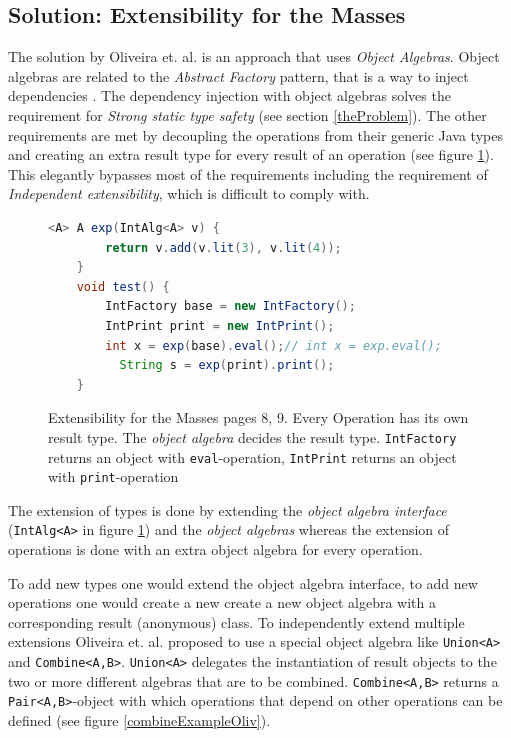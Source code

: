 \documentclass{report}
\begin{document}

\subsection{Solution: Extensibility for the Masses}

The solution by Oliveira et. al. \cite{Oliv-Extensibility-2012} is an approach that uses \emph{Object Algebras}. Object algebras are related to the \emph{Abstract Factory} pattern, that is a way to inject dependencies \cite{Gof-Design-1993}. The dependency injection with object algebras solves the requirement for \emph{Strong static type safety} (see section \ref{theProblem}). The other requirements are met by decoupling the operations from their generic Java types and creating an extra result type for every result of an operation (see figure \ref{differentAlgebras}). This elegantly bypasses most of the requirements including the requirement of \emph{Independent extensibility}, which is difficult to comply with.

\begin{figure}[h]
\begin{lstlisting}[language=java]
    <A> A exp(IntAlg<A> v) {
        return v.add(v.lit(3), v.lit(4));
    }
    void test() {
        IntFactory base = new IntFactory();
        IntPrint print = new IntPrint();
        int x = exp(base).eval();// int x = exp.eval();
￼￼        String s = exp(print).print();
    }
\end{lstlisting}
\caption{Extensibility for the Masses \cite{Oliv-Extensibility-2012} pages 8, 9. Every Operation has its own result type. The \emph{object algebra} decides the result type. \lstinline{IntFactory} returns an object with \lstinline{eval}-operation, \lstinline{IntPrint} returns an object with \lstinline{print}-operation}
\label{differentAlgebras}
\end{figure}

The extension of types is done by extending the \emph{object algebra interface} (\lstinline{IntAlg<A>} in figure \ref{differentAlgebras}) and the \emph{object algebras} whereas the extension of operations is done with an extra object algebra for every operation.

To add new types one would extend the object algebra interface, to add new operations one would create a new create a new object algebra with a corresponding result (anonymous) class. To independently extend multiple extensions Oliveira et. al. proposed to use a special object algebra like \lstinline{Union<A>} and \lstinline{Combine<A,B>}. \lstinline{Union<A>} delegates the instantiation of result objects to the two or more different algebras that are to be combined. \lstinline{Combine<A,B>} returns a \lstinline{Pair<A,B>}-object with which operations that depend on other operations can be defined (see figure \ref{combineExampleOliv}).
\end{document}
